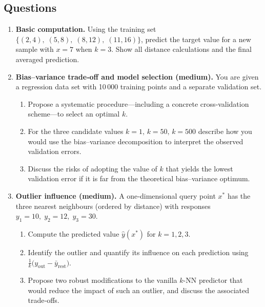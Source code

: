 \documentclass[12pt, a4paper]{article}
\begin{document}
\subsection*{Questions}
\begin{enumerate}
    \item \textbf{Basic computation.}  
    Using the training set \(\{(2,4),\;(5,8),\;(8,12),\;(11,16)\}\), predict the target value for a new sample with \(x=7\) when \(k=3\).  Show all distance calculations and the final averaged prediction.

    \item \textbf{Bias–variance trade‑off and model selection (medium).}  
    You are given a regression data set with 10 000 training points and a separate validation set.  
    \begin{enumerate}
        \item Propose a systematic procedure—including a concrete cross‑validation scheme—to select an optimal \(k\).  
        \item For the three candidate values \(k=1,\,k=50,\,k=500\) describe how you would use the bias–variance decomposition to interpret the observed validation errors.  
        \item Discuss the risks of adopting the value of \(k\) that yields the lowest validation error if it is far from the theoretical bias–variance optimum.
    \end{enumerate}

    \item \textbf{Outlier influence (medium).}  
    A one‑dimensional query point \(x^{\ast}\) has the three nearest neighbours (ordered by distance) with responses \(y_{1}=10,\;y_{2}=12,\;y_{3}=30\).  
    \begin{enumerate}
        \item Compute the predicted value \(\hat y(x^{\ast})\) for \(k=1,2,3\).  
        \item Identify the outlier and quantify its influence on each prediction using \(\displaystyle\frac{1}{k}\bigl(y_{\text{out}}-\bar y_{\text{rest}}\bigr)\).  
        \item Propose two robust modifications to the vanilla \(k\)-NN predictor that would reduce the impact of such an outlier, and discuss the associated trade‑offs.
    \end{enumerate}


\end{enumerate}
\end{document}
